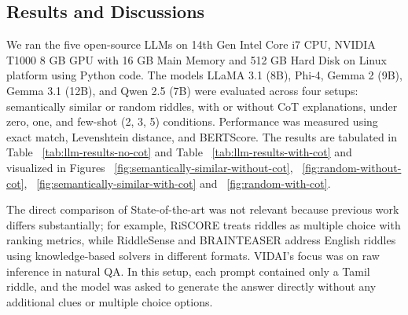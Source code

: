 \documentclass[11pt]{article}
\begin{document}
\subsection{Results and Discussions}
We ran the five open-source LLMs on 14th Gen Intel Core i7 CPU, NVIDIA T1000 8 GB GPU with 16 GB Main Memory and 512 GB Hard Disk on Linux platform using Python code. The models LLaMA 3.1 (8B), Phi-4, Gemma 2 (9B), Gemma 3.1 (12B), and Qwen 2.5 (7B) were evaluated across four setups: semantically similar or random riddles, with or without CoT explanations, under zero, one, and few-shot (2, 3, 5) conditions. Performance was measured using exact match, Levenshtein distance, and BERTScore. The results are tabulated in Table ~\ref{tab:llm-results-no-cot} and Table ~\ref{tab:llm-results-with-cot} and visualized in Figures ~\ref{fig:semantically-similar-without-cot}, ~\ref{fig:random-without-cot}, ~\ref{fig:semantically-similar-with-cot} and ~\ref{fig:random-with-cot}.

The direct comparison of State-of-the-art was not relevant because previous work differs substantially; for example, RiSCORE \cite{panagiotopoulos-etal-2025-riscore} treats riddles as multiple choice with ranking metrics, while RiddleSense \cite{lin-etal-2021-riddlesense} and BRAINTEASER \cite{jiang-etal-2023-brainteaser} address English riddles using knowledge-based solvers in different formats. VIDAI's focus was on raw inference in natural QA. In this setup, each prompt contained only a Tamil riddle, and the model was asked to generate the answer directly without any additional clues or multiple choice options.
\end{document}
